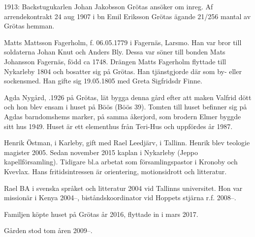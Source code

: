1913: Backstugukarlen Johan Jakobsson Grötas ansöker om inreg. Af arrendekontrakt 24 aug 1907 i bn Emil Eriksson Grötas ägande 21/256 mantal av Grötas hemman.

Matts Mattsson Fagerholm, f. 06.05.1779 i Fagernäs, Larsmo. Han var bror till soldaterna Johan Knut och Anders Bly. Dessa var söner till bonden Mats Johansson Fagernäs, född ca 1748.
Drängen Matts Fagerholm flyttade till Nykarleby 1804 och bosatter sig på Grötas. Han tjänstgjorde där som by- eller sockensmed. Han gifte sig 19.05.1805 med Greta Sigfridsdr Finne.




Agda Nygård, .1926 på Grötas, lät bygga denna gård efter att maken Valfrid dött och hon blev ensam i huset på Böös (Böös 39). Tomten till huset befinner sig på Agdas barndomshems marker, på samma åkerjord, som brodern Elmer byggde sitt hus 1949. Huset är ett elementhus från Teri-Hus och uppfördes år 1987.




Henrik Östman,  i Karleby, gift med Rael Leedjärv,   i Tallinn. Henrik blev teologie magister 2005. Sedan november 2015 kaplan i Nykarleby (Jeppo kapellförsamling). Tidigare bl.a arbetat som församlingspastor i Kronoby och Kvevlax. Hans fritidsintressen är orientering, motionsidrott och litteratur.


Rael BA i svenska språket och litteratur 2004 vid Tallinns universitet. Hon var missionär i Kenya 2004--, biståndskoordinator vid Hoppets stjärna r.f. 2008--.
\begin{jhchildren}
  \item {}
  \item {}
\end{jhchildren}
Familjen köpte huset på Grötas år 2016, flyttade in i mars 2017.


Gården stod tom åren 2009--.


